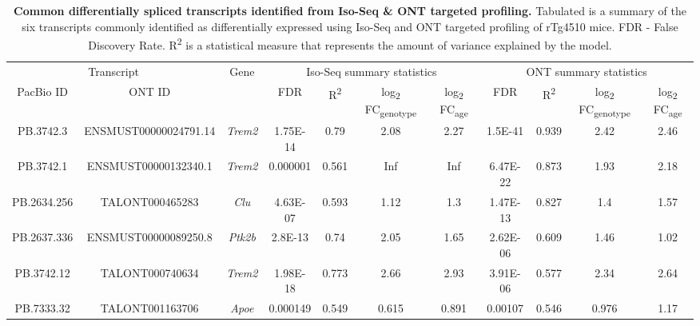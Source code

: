 \begin{landscape}
\begin{table}[]
	\centering
	\captionsetup{width=1.5\textwidth}
	\caption[Common differentially spliced transcripts identified targeted profiling]%
	{\textbf{Common differentially spliced transcripts identified from Iso-Seq \& ONT targeted profiling.} Tabulated is a summary of the six transcripts commonly identified as differentially expressed using Iso-Seq and ONT targeted profiling of rTg4510 mice. FDR - False Discovery Rate. R\textsuperscript{2} is a statistical measure that represents the amount of variance explained by the model.}
	\label{tab_diffcommon}
	\setlength\tabcolsep{5.5pt} %
	\begin{threeparttable}
	\begin{tabular}{@{}ccccccccccc@{}}
		\toprule
		\multicolumn{2}{c}{Transcript} & \multirow{2}{*}{Gene} & \multicolumn{4}{c}{Iso-Seq summary statistics} & \multicolumn{4}{c}{ONT summary statistics} \\ \cmidrule(r){1-2} \cmidrule(l){4-11} 
		PacBio ID   & ONT ID\tnote{a}                &       & FDR      & R\textsuperscript{2}     & log\textsubscript{2} FC\textsubscript{genotype}\tnote{b} & log\textsubscript{2} FC\textsubscript{age}\tnote{c} & FDR      & R\textsuperscript{2}     & log\textsubscript{2} FC\textsubscript{genotype}\tnote{b} & log\textsubscript{2} FC\textsubscript{age}\tnote{c} \\ \midrule
		PB.3742.3   & ENSMUST00000024791.14 & \textit{Trem2} & 1.75E-14 & 0.79  & 2.08   & 2.27   & 1.5E-41  & 0.939 & 2.42   & 2.46   \\
		PB.3742.1   & ENSMUST00000132340.1  & \textit{Trem2} & 0.000001 & 0.561 & Inf    & Inf    & 6.47E-22 & 0.873 & 1.93   & 2.18   \\
		PB.2634.256 & TALONT000465283       & \textit{Clu}   & 4.63E-07 & 0.593 & 1.12   & 1.3    & 1.47E-13 & 0.827 & 1.4    & 1.57   \\
		PB.2637.336 & ENSMUST00000089250.8  & \textit{Ptk2b} & 2.8E-13  & 0.74  & 2.05   & 1.65   & 2.62E-06 & 0.609 & 1.46   & 1.02   \\
		PB.3742.12  & TALONT000740634       & \textit{Trem2} & 1.98E-18 & 0.773 & 2.66   & 2.93   & 3.91E-06 & 0.577 & 2.34   & 2.64   \\
		PB.7333.32  & TALONT001163706       & \textit{Apoe}  & 0.000149 & 0.549 & 0.615  & 0.891  & 0.00107  & 0.546 & 0.976  & 1.17   \\ \bottomrule
	\end{tabular}

\end{threeparttable}
\end{table}
\end{landscape}

